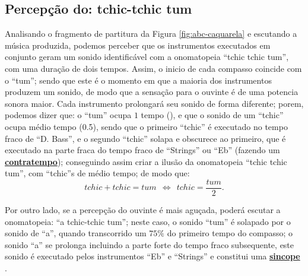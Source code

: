 \subsection{Percepção do: tchic-tchic tum}
Analisando o fragmento de partitura da Figura \ref{fig:abc-caquarela} e escutando a música produzida, 
podemos perceber que os instrumentos executados em conjunto geram um sonido identificável
com a onomatopeia ``tchic tchic tum'', com uma duração de dois tempos.
Assim, o inicio de cada compasso coincide com o ``tum''; 
sendo que este é o momento em que a maioria dos instrumentos produzem um sonido, 
de modo que a sensação para o ouvinte é de uma potencia sonora maior. 
Cada instrumento prolongará seu sonido de forma diferente; 
porem,  podemos dizer que: o ``tum'' ocupa $1$ tempo (\quarternote), 
e que o sonido de um ``tchic'' ocupa médio tempo (0.5\quarternote),
sendo que o primeiro ``tchic'' é executado no tempo fraco de ``D. Bass'', 
e o segundo ``tchic'' solapa e obscurece ao  primeiro, 
que é executado na parte fraca do tempo fraco de ``Strings'' ou ``Eb'' (fazendo um \hyperref[sec:contratempo]{\textbf{contratempo}});
conseguindo assim criar a ilusão da onomatopeia ``tchic tchic tum'', 
com ``tchic''s de médio tempo; de modo que:
\begin{equation}
tchic + tchic = tum ~~ \Longleftrightarrow ~~ tchic = \frac{tum}{2}.
\end{equation}
 
Por outro lado, se a percepção do ouvinte é mais
aguçada, poderá escutar a onomatopeia: ``a tchic-tchic tum''; 
neste caso, o sonido ``tum'' é solapado por o sonido de ``a'',
quando transcorrido um $75\%$ do primeiro tempo do compasso; 
o sonido ``a''  se prolonga incluindo a parte forte do tempo fraco subsequente, 
este sonido é executado pelos instrumentos ``Eb'' e ``Strings'' e constitui uma 
\hyperref[sec:sincope]{\textbf{sincope}} \cite[pp. 143]{medteoria}.


